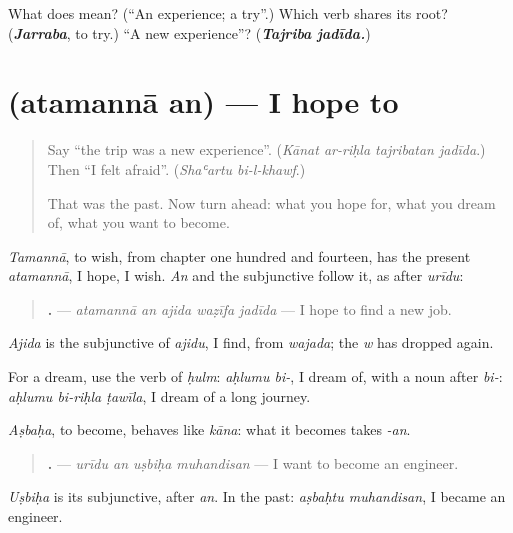 \begin{tcolorbox}[breakable,colback=teal!4,colframe=teal!35!black,title={Before you move on}]
What does  mean? (\textquotedblleft{}An experience; a try\textquotedblright{}.) Which verb shares its root? (\emph{\textbf{Jarraba}}, to try.) \textquotedblleft{}A new experience\textquotedblright{}? (\emph{\textbf{Tajriba jadīda.}})
\end{tcolorbox}
\section[\texorpdfstring{\ar{أتمنى} \ar{أن} (atamannā an)}{أتمنى أن (atamannā an)}]{  (atamannā an) — I hope to}

\label{lesson:AR-C289-atamanna-an}



\begin{quote}
Say \textquotedblleft{}the trip was a new experience\textquotedblright{}. (\emph{Kānat ar-riḥla tajribatan jadīda}.) Then \textquotedblleft{}I felt afraid\textquotedblright{}. (\emph{Shaʿartu bi-l-khawf}.)

That was the past. Now turn ahead: what you hope for, what you dream of, what you want to become.
\end{quote}

\begin{grammarlens}[title={Grammar Lens: atamannā an, aḥlumu bi-}]
\emph{Tamannā}, to wish, from chapter one hundred and fourteen, has the present \emph{atamannā}, I hope, I wish. \emph{An} and the subjunctive follow it, as after \emph{urīdu}:

\begin{quote}
\textbf{    .} — \emph{atamannā an ajida waẓīfa jadīda} — I hope to find a new job.
\end{quote}

\emph{Ajida} is the subjunctive of \emph{ajidu}, I find, from \emph{wajada}; the \emph{w} has dropped again.

For a dream, use the verb of \emph{ḥulm}: \emph{aḥlumu bi-}, I dream of, with a noun after \emph{bi-}: \emph{aḥlumu bi-riḥla ṭawīla}, I dream of a long journey.
\end{grammarlens}

\begin{grammarlens}[title={Grammar Lens: what you want to become}]
\emph{Aṣbaḥa}, to become, behaves like \emph{kāna}: what it becomes takes \emph{-an}.

\begin{quote}
\textbf{   .} — \emph{urīdu an uṣbiḥa muhandisan} — I want to become an engineer.
\end{quote}

\emph{Uṣbiḥa} is its subjunctive, after \emph{an}. In the past: \emph{aṣbaḥtu muhandisan}, I became an engineer.
\end{grammarlens}


